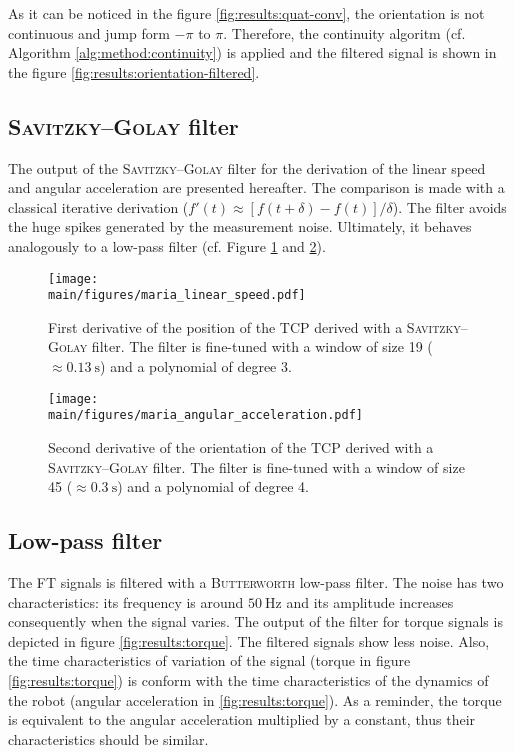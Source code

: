 \documentclass[/home/francois/latex/report/main.tex]{subfiles}
\begin{document}
As it can be noticed in the figure \ref{fig:results:quat-conv}, the orientation is not continuous and jump form $-\pi$ to $\pi$. Therefore, the continuity algoritm (cf. Algorithm \ref{alg:method:continuity}) is applied and the filtered signal is shown in the figure \ref{fig:results:orientation-filtered}.

\subsection{\textsc{Savitzky–Golay} filter}

The output of the \textsc{Savitzky–Golay} filter for the derivation of the linear speed and angular acceleration are presented hereafter. The comparison is made with a classical iterative derivation ($f'(t) \approx  [f(t+\delta) - f(t)] / \delta$). The filter avoids the huge spikes generated by the measurement noise. Ultimately, it behaves analogously to a low-pass filter (cf. Figure \ref{fig:results:linear-speed-filtered} and \ref{fig:results:angular-acceleration-filtered}).

\begin{figure}[h]
  \centering
  \texttt{[image: \\main/figures/maria\_linear\_speed.pdf]}
  \caption{First derivative of the position of the \ac{TCP} derived with a \textsc{Savitzky–Golay} filter. The filter is fine-tuned with a window of size 19 ($\approx 0.13 \ \si{\second}$) and a polynomial of degree 3.}
  \label{fig:results:linear-speed-filtered}
\end{figure}

\begin{figure}[h]
  \centering
  \texttt{[image: \\main/figures/maria\_angular\_acceleration.pdf]}
  \caption{Second derivative of the orientation of the \ac{TCP} derived with a \textsc{Savitzky–Golay} filter. The filter is fine-tuned with a window of size 45 ($\approx 0.3 \ \si{\second}$) and a polynomial of degree 4.}
  \label{fig:results:angular-acceleration-filtered}
\end{figure}


\subsection{Low-pass filter}

The \ac{FT} signals is filtered with a \textsc{Butterworth} low-pass filter. The noise has two characteristics: its frequency is around $50 \ \si{\hertz}$ and its amplitude increases consequently when the signal varies. The output of the filter for torque signals is depicted in figure \ref{fig:results:torque}. The filtered signals show less noise. Also, the time characteristics of variation of the signal (torque in figure \ref{fig:results:torque}) is conform with the time characteristics of the dynamics of the robot (angular acceleration in \ref{fig:results:torque}). As a reminder, the torque is equivalent to the angular acceleration multiplied by a constant, thus their characteristics should be similar.
\end{document}
